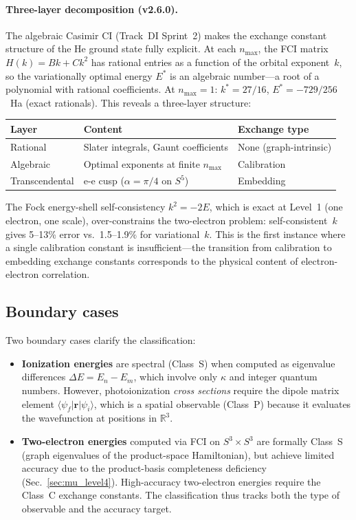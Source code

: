 \documentclass[aps,pra,twocolumn,superscriptaddress,longbibliography]{revtex4-2}
\begin{document}
\paragraph{Three-layer decomposition (v2.6.0).}
The algebraic Casimir CI (Track~DI Sprint~2) makes the exchange
constant structure of the He ground state fully explicit.  At each
$n_{\max}$, the FCI matrix $H(k) = Bk + Ck^2$ has rational entries
as a function of the orbital exponent~$k$, so the variationally
optimal energy $E^*$ is an algebraic number---a root of a polynomial
with rational coefficients.  At $n_{\max} = 1$: $k^* = 27/16$,
$E^* = -729/256$~Ha (exact rationals).  This reveals a three-layer
structure:
\begin{center}
\begin{tabular}{lll}
\hline
Layer & Content & Exchange type \\
\hline
Rational & Slater integrals, Gaunt coefficients & None (graph-intrinsic) \\
Algebraic & Optimal exponents at finite $n_{\max}$ & Calibration \\
Transcendental & e-e cusp ($\alpha = \pi/4$ on $S^5$) & Embedding \\
\hline
\end{tabular}
\end{center}
The Fock energy-shell self-consistency $k^2 = -2E$, which is exact
at Level~1 (one electron, one scale), over-constrains the
two-electron problem: self-consistent~$k$ gives 5--13\% error vs.\
1.5--1.9\% for variational~$k$.  This is the first instance where a
single calibration constant is insufficient---the transition from
calibration to embedding exchange constants corresponds to the
physical content of electron-electron correlation.

\subsection{Boundary cases}

Two boundary cases clarify the classification:

\begin{itemize}
  \item \textbf{Ionization energies} are spectral (Class~S) when
    computed as eigenvalue differences $\Delta E = E_n - E_m$,
    which involve only $\kappa$ and integer quantum numbers.
    However, photoionization \emph{cross sections} require the
    dipole matrix element $\langle \psi_f | \mathbf{r} | \psi_i
    \rangle$, which is a spatial observable (Class~P) because
    it evaluates the wavefunction at positions in $\mathbb{R}^3$.

  \item \textbf{Two-electron energies} computed via FCI on
    $S^3 \times S^3$ are formally Class~S (graph eigenvalues
    of the product-space Hamiltonian), but achieve limited
    accuracy due to the product-basis completeness deficiency
    (Sec.~\ref{sec:mu_level4}).  High-accuracy two-electron
    energies require the Class~C exchange constants.
    The classification thus tracks both the type of observable
    and the accuracy target.
\end{itemize}
\end{document}
